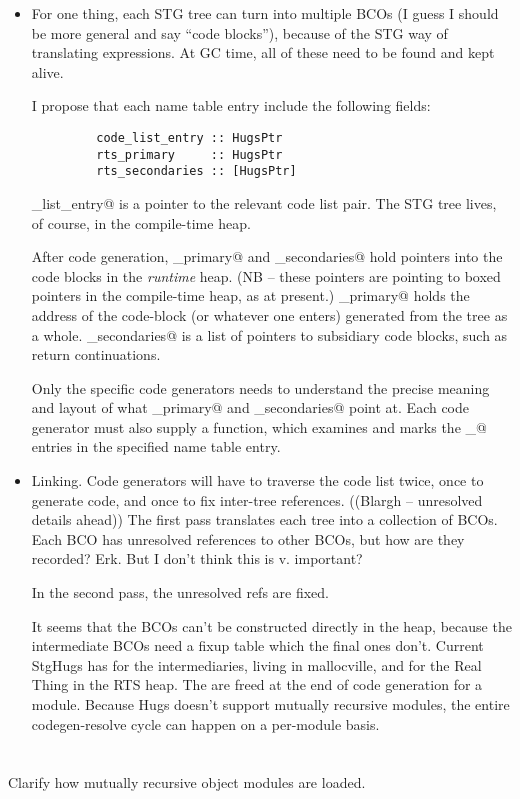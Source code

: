 \begin{itemize}
\item For one thing, each STG tree can turn into multiple 
      BCOs (I guess I should be more general and say ``code blocks''),
      because of the STG way of translating \verb@case@ expressions.
      At GC time, all of these need to be found and kept alive.
      
      I propose that each name table entry include the following
      fields:
      \begin{verbatim}
         code_list_entry :: HugsPtr
         rts_primary     :: HugsPtr
         rts_secondaries :: [HugsPtr]
      \end{verbatim}
      \verb@code_list_entry@ is a pointer to the relevant 
      code list pair.  The STG tree lives, of course, in the
      compile-time heap.

      After code generation, \verb@rts_primary@ and
      \verb@rts_secondaries@ hold pointers into the code blocks
      in the {\em runtime} heap.  (NB -- these pointers are
      \verb@HugsPtr@s pointing to boxed pointers in the compile-time
      heap, as at present.)  \verb@rts_primary@ holds the address
      of the code-block (or whatever one enters) generated from
      the tree as a whole.  \verb@rts_secondaries@ is a list of
      pointers to subsidiary code blocks, such as \verb@case@ 
      return continuations.

      Only the specific code generators needs to understand the
      precise meaning and layout of what \verb@rts_primary@ and
      \verb@rts_secondaries@ point at.  Each code generator
      must also supply a \verb@markRTSobjects@ function, which
      examines and marks the \verb@rts_@ entries in the specified
      name table entry.

\item Linking.  
      Code generators will have to traverse the code list twice,
      once to generate code, and once to fix inter-tree
      references.  ((Blargh -- unresolved details ahead))
      The first pass translates each tree into a collection 
      of BCOs.  Each BCO has unresolved references to other
      BCOs, but how are they recorded?  Erk.  But I don't 
      think this is v. important?
  
      In the second pass, the unresolved refs are fixed.

      It seems that the BCOs can't be constructed directly in the
      heap, because the intermediate BCOs need a fixup table which
      the final ones don't.  Current StgHugs has \verb@AsmBCO@s for
      the intermediaries, living in mallocville, and \verb@StgBCOs@
      for the Real Thing in the RTS heap.  The \verb@AsmBCO@s are
      freed at the end of code generation for a module.  Because
      Hugs doesn't support mutually recursive modules, the entire
      codegen-resolve cycle can happen on a per-module basis.

\end{itemize}

\section{\ToDo{}}
Clarify how mutually recursive object modules are loaded.


